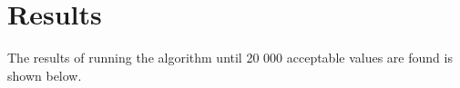 \chapter{Results} \label{results}

The results of running the algorithm until 20 000 acceptable values are found is shown below.

